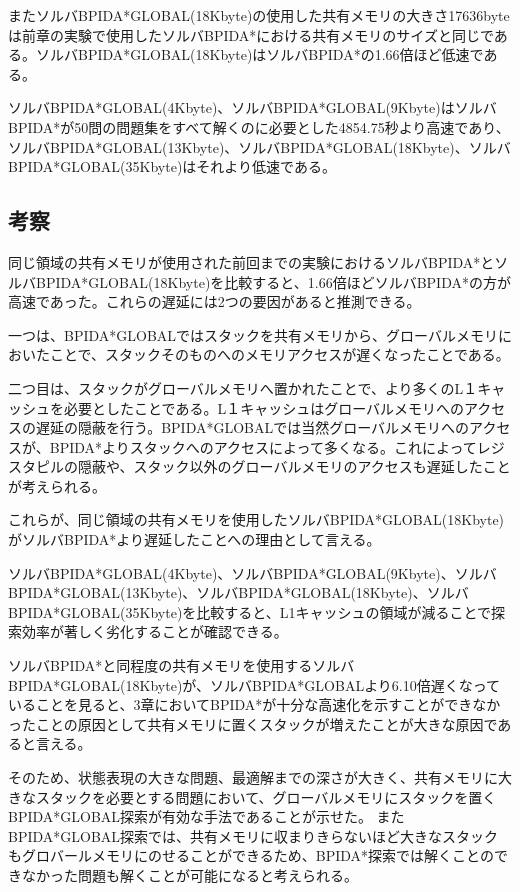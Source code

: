 \documentclass[a4paper,11pt,oneside,openany]{jsbook}
\begin{document}
またソルバBPIDA*GLOBAL(18Kbyte)の使用した共有メモリの大きさ17636byteは前章の実験で使用したソルバBPIDA*における共有メモリのサイズと同じである。ソルバBPIDA*GLOBAL(18Kbyte)はソルバBPIDA*の1.66倍ほど低速である。


ソルバBPIDA*GLOBAL(4Kbyte)、ソルバBPIDA*GLOBAL(9Kbyte)はソルバBPIDA*が50問の問題集をすべて解くのに必要とした4854.75秒より高速であり、ソルバBPIDA*GLOBAL(13Kbyte)、ソルバBPIDA*GLOBAL(18Kbyte)、ソルバBPIDA*GLOBAL(35Kbyte)はそれより低速である。

\subsection{考察}
同じ領域の共有メモリが使用された前回までの実験におけるソルバBPIDA*とソルバBPIDA*GLOBAL(18Kbyte)を比較すると、1.66倍ほどソルバBPIDA*の方が高速であった。これらの遅延には2つの要因があると推測できる。

一つは、BPIDA*GLOBALではスタックを共有メモリから、グローバルメモリにおいたことで、スタックそのものへのメモリアクセスが遅くなったことである。

二つ目は、スタックがグローバルメモリへ置かれたことで、より多くのL１キャッシュを必要としたことである。L１キャッシュはグローバルメモリへのアクセスの遅延の隠蔽を行う。BPIDA*GLOBALでは当然グローバルメモリへのアクセスが、BPIDA*よりスタックへのアクセスによって多くなる。これによってレジスタピルの隠蔽や、スタック以外のグローバルメモリのアクセスも遅延したことが考えられる。

これらが、同じ領域の共有メモリを使用したソルバBPIDA*GLOBAL(18Kbyte)がソルバBPIDA*より遅延したことへの理由として言える。

ソルバBPIDA*GLOBAL(4Kbyte)、ソルバBPIDA*GLOBAL(9Kbyte)、ソルバBPIDA*GLOBAL(13Kbyte)、ソルバBPIDA*GLOBAL(18Kbyte)、ソルバBPIDA*GLOBAL(35Kbyte)を比較すると、L1キャッシュの領域が減ることで探索効率が著しく劣化することが確認できる。

ソルバBPIDA*と同程度の共有メモリを使用するソルバBPIDA*GLOBAL(18Kbyte)が、ソルバBPIDA*GLOBALより6.10倍遅くなっていることを見ると、3章においてBPIDA*が十分な高速化を示すことができなかったことの原因として共有メモリに置くスタックが増えたことが大きな原因であると言える。

そのため、状態表現の大きな問題、最適解までの深さが大きく、共有メモリに大きなスタックを必要とする問題において、グローバルメモリにスタックを置くBPIDA*GLOBAL探索が有効な手法であることが示せた。
またBPIDA*GLOBAL探索では、共有メモリに収まりきらないほど大きなスタックもグロバールメモリにのせることができるため、BPIDA*探索では解くことのできなかった問題も解くことが可能になると考えられる。
\end{document}
